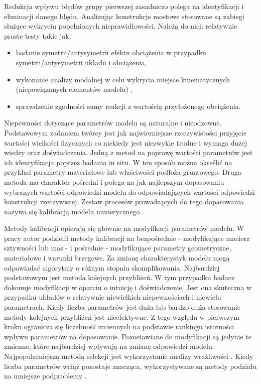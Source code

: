 Redukcja wpływu błędów grupy pierwszej zasadniczo polega na identyfikacji i eliminacji danego błędu. Analizując konstrukcje mostowe stosowane są zabiegi służące wykryciu popełnionych nieprawidłowości. Należą do nich relatywnie proste testy takie jak:
\begin{itemize}
	\item badanie symetrii/antysymetrii efektu obciążenia w przypadku symetrii/antysymetrii układu i obciążenia,
	\item wykonanie analizy modalnej w celu wykrycia miejsce kinematycznych (niepowiązanych elementów modelu) \parencite{Szafranski2013a}, 
	\item sprawdzenie zgodności sumy reakcji z wartością przyłożonego obciążenia. 
\end{itemize}


Niepewności dotyczące parametrów modelu są naturalne i nieodzowne. Podstawowym zadaniem twórcy jest jak najwierniejsze rzeczywistości przyjęcie wartości wielkości fizycznych co niekiedy jest niezwykle trudne i wymaga dużej wiedzy oraz doświadczenia. Jedną z metod na poprawę wartości parametrów jest ich  identyfikacja poprzez badania in situ. W ten sposób można określić na przykład parametry materiałowe lub właściwości podłoża gruntowego. Druga metoda ma charakter pośredni i polega na jak najlepszym dopasowaniu wybranych wartości odpowiedzi modelu do odpowiadających wartości odpowiedzi konstrukcji rzeczywistej. Zestaw procesów prowadzących do tego dopasowania nazywa się kalibracją modelu numerycznego . 

Metody kalibracji opierają się głównie na modyfikacji parametrów modelu. W pracy \cite{Batou2019} autor podzielił metody kalibracji na bezpośrednie - modyfikujące macierz sztywności lub mas - i pośrednie - modyfikujące parametry geometryczne, materiałowe i warunki brzegowe. Za zmianę charakterystyk modelu mogą odpowiadać algorytmy o różnym stopniu skomplikowania. Najbardziej podstawowym jest metoda kolejnych przybliżeń. W tym przypadku badacz dokonuje modyfikacji w oparciu o intuicję i doświadczenie. Jest ona skuteczna w przypadku układów o relatywnie niewielkich niepewnościach i niewielu parametrach. Kiedy liczba parametrów jest duża lub bardzo duża stosowanie metody kolejnych przybliżeń jest nieefektywne. Z tego względu w pierwszym kroku ogranicza się liczebność zmiennych na podstawie rankingu istotności wpływu parametrów na dopasowanie. Pozostawiane do modyfikacji są jedynie te zmienne, które najbardziej wpływają na zmianę odpowiedzi modelu. Najpopularniejszą metodą selekcji jest wykorzystanie analizy wrażliwości \parencite{Friswell2001,Mottershead2011,Petersen2017,Batou2019}.  Kiedy liczba parametrów wciąż pozostaje znacząca, wykorzystywane są metody podziału na mniejsze podproblemy \parencite{Weng2020,Yu2016}. 

